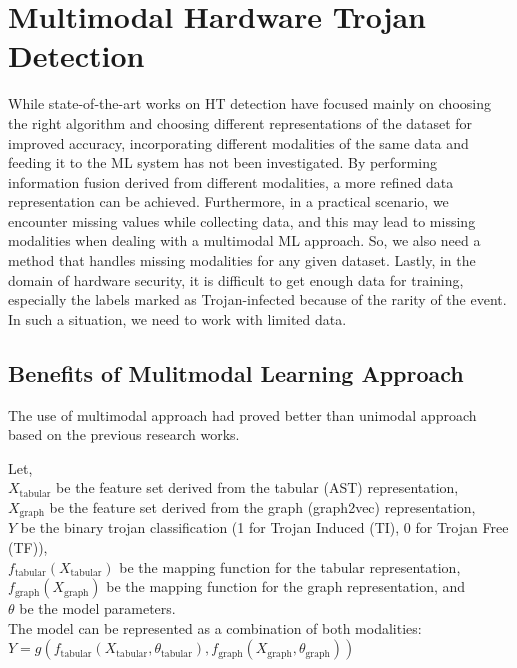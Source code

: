 \section*{Multimodal Hardware Trojan
Detection}
\label{sec:solution}
While state-of-the-art works on HT detection have focused mainly on choosing the right algorithm and choosing different representations of the dataset for improved accuracy, incorporating different modalities of the same data and feeding it to the ML system has not been investigated. By performing information fusion derived from different modalities, a more refined data representation can be achieved. Furthermore, in a practical scenario, we encounter missing values while collecting data, and this may lead to missing modalities when dealing with a multimodal ML approach. So, we also need a method that handles missing modalities for any given dataset. Lastly, in the domain of hardware security, it is difficult to get enough data for training, especially the labels marked as Trojan-infected because of the rarity of the event. In such a situation, we need to work with limited data.

\subsection*{Benefits of Mulitmodal Learning Approach}
The use of multimodal approach had proved better than unimodal approach based on the previous research works. 

Let, \\ 

\( X_{\text{tabular}} \) be the feature set derived from the tabular (AST) representation, \\
\( X_{\text{graph}} \) be the feature set derived from the graph (graph2vec) representation, \\
\( Y \) be the binary trojan classification (1 for Trojan Induced (TI), 0 for Trojan Free (TF)), \\
\( f_{\text{tabular}}(X_{\text{tabular}}) \) be the mapping function for the tabular representation, \\
\( f_{\text{graph}}(X_{\text{graph}}) \) be the mapping function for the graph representation, and \\
\( \theta \) be the model parameters. \\

The model can be represented as a combination of both modalities: \\

\( Y = g(f_{\text{tabular}}(X_{\text{tabular}}, \theta_{\text{tabular}}), f_{\text{graph}}(X_{\text{graph}}, \theta_{\text{graph}})) \)

